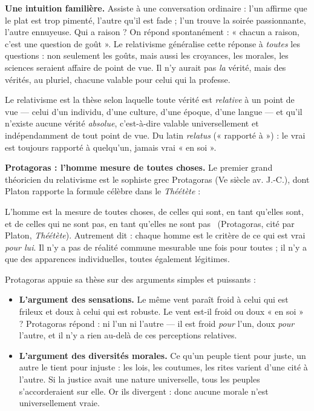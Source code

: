 \documentclass[11pt]{article}
\newcommand{\cle}[1]{{\popxbold\color{popdark}#1}}
\newcounter{popsec}
\newcounter{popsub}
\newcommand{\courssub}[1]{%
  \stepcounter{popsub}%
  \par\vspace{9pt}\noindent{\popxbold\fontsize{11.5}{13}\selectfont\color{popink}{\color{poporange}\thepopsec.\thepopsub}\hspace{6pt}#1}\par\nopagebreak\vspace{4pt}
}
\begin{document}
\courssub{Le relativisme : chacun sa vérité ?}

\textbf{Une intuition familière.} Assiste à une conversation ordinaire : l'un affirme que le plat est trop pimenté, l'autre qu'il est fade ; l'un trouve la soirée passionnante, l'autre ennuyeuse. Qui a raison ? On répond spontanément : « chacun a raison, c'est une question de goût ». Le relativisme généralise cette réponse à \emph{toutes} les questions : non seulement les goûts, mais aussi les croyances, les morales, les sciences seraient affaire de point de vue. Il n'y aurait pas \emph{la} vérité, mais des vérités, au pluriel, chacune valable pour celui qui la professe.

\begin{definition}[Le relativisme]
Le \cle{relativisme} est la thèse selon laquelle toute vérité est \emph{relative} à un point de vue — celui d'un individu, d'une culture, d'une époque, d'une langue — et qu'il n'existe aucune vérité \emph{absolue}, c'est-à-dire valable universellement et indépendamment de tout point de vue. Du latin \emph{relatus} (« rapporté à ») : le vrai est toujours rapporté à quelqu'un, jamais vrai « en soi ».
\end{definition}

\textbf{Protagoras : l'homme mesure de toutes choses.} Le premier grand théoricien du relativisme est le sophiste grec Protagoras (Ve siècle av. J.-C.), dont Platon rapporte la formule célèbre dans le \emph{Théétète} :

\begin{propriete}
\guillemotleft L'homme est la mesure de toutes choses, de celles qui sont, en tant qu'elles sont, et de celles qui ne sont pas, en tant qu'elles ne sont pas \guillemotright\ (Protagoras, cité par Platon, \emph{Théétète}). Autrement dit : chaque homme est le critère de ce qui est vrai \emph{pour lui}. Il n'y a pas de réalité commune mesurable une fois pour toutes ; il n'y a que des apparences individuelles, toutes également légitimes.
\end{propriete}

Protagoras appuie sa thèse sur des arguments simples et puissants :

\begin{itemize}
\item \textbf{L'argument des sensations.} Le même vent paraît froid à celui qui est frileux et doux à celui qui est robuste. Le vent est-il froid ou doux « en soi » ? Protagoras répond : ni l'un ni l'autre — il est froid \emph{pour} l'un, doux \emph{pour} l'autre, et il n'y a rien au-delà de ces perceptions relatives.
\item \textbf{L'argument des diversités morales.} Ce qu'un peuple tient pour juste, un autre le tient pour injuste : les lois, les coutumes, les rites varient d'une cité à l'autre. Si la justice avait une nature universelle, tous les peuples s'accorderaient sur elle. Or ils divergent : donc aucune morale n'est universellement vraie.
\end{itemize}
\end{document}
